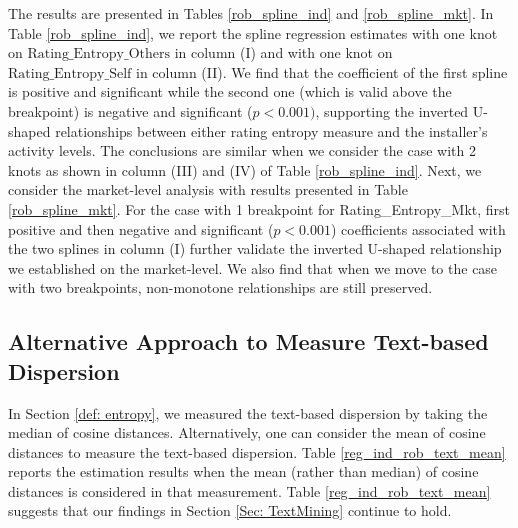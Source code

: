\documentclass[msom,blindrev]{informs3}
\begin{document}
	
	The results are presented in Tables \ref{rob_spline_ind} and \ref{rob_spline_mkt}. In Table \ref{rob_spline_ind}, we report the spline regression estimates with one knot on $\text{Rating\_Entropy\_Others}$ in column (I) and with one knot on $\text{Rating\_Entropy\_Self}$ in column (II). We find that the coefficient of the first spline is positive and significant while the second one (which is valid above the breakpoint) is negative and significant ($p<0.001)$, supporting the inverted U-shaped relationships between either rating entropy measure and the installer's activity levels. The conclusions are similar when we consider the case with 2 knots as shown in column (III) and (IV) of Table \ref{rob_spline_ind}.  Next, we consider the market-level analysis with results presented in Table \ref{rob_spline_mkt}. For the case with 1 breakpoint for Rating\_Entropy\_Mkt, first positive and then negative and significant ($p<0.001$) coefficients associated with the two splines in column (I) further validate the inverted U-shaped relationship we established on the market-level. We also find that when we move to the case with two breakpoints, non-monotone relationships are still preserved.
	
	
	
	\subsection{Alternative Approach to Measure Text-based Dispersion}
	
	In Section \ref{def: entropy}, we measured the text-based dispersion by taking the median of cosine distances. Alternatively, one can consider the mean of cosine distances to measure the text-based dispersion. Table \ref{reg_ind_rob_text_mean} reports the estimation results when the mean (rather than median) of cosine distances is considered in that measurement. Table \ref{reg_ind_rob_text_mean} suggests that our findings in Section \ref{Sec: TextMining} continue to hold.
	
\end{document}
